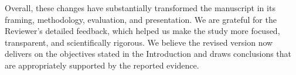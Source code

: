\documentclass{article}
\begin{document}
Overall, these changes have substantially transformed the manuscript in its
framing, methodology, evaluation, and presentation. We are grateful for the
Reviewer's detailed feedback, which helped us make the study more focused,
transparent, and scientifically rigorous. We believe the revised version now
delivers on the objectives stated in the Introduction and draws conclusions that
are appropriately supported by the reported evidence.
\end{document}

